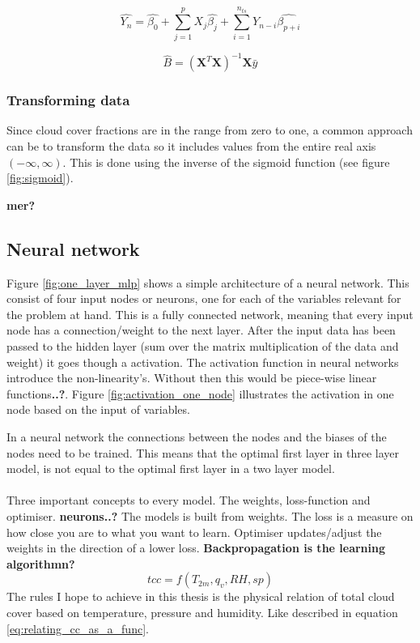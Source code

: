 \begin{equation} \label{eq:AR-expression}
    \hat{Y_n} = \hat{\beta_0} + \sum_{j=1}^p X_j\hat{\beta_j} + \sum_{i = 1}^{n_{ts}} Y_{n-i}\hat{\beta_{p+i}}
\end{equation}

\begin{equation} \label{eq:AR-solution}
    \hat{B} = \left( \textbf{X}^T\textbf{X} \right)^{-1}\textbf{X}\bar{y}
\end{equation}

\subsubsection{Transforming data} \label{sec:transforming_cloud_cover}
Since cloud cover fractions are in the range from zero to one, a common approach can be to transform the data so it includes values from the entire real axis $(-\infty, \infty)$. This is done using the inverse of the sigmoid function (see figure \ref{fig:sigmoid}).

\textbf{mer?}

\subsection{Neural network}

Figure \ref{fig:one_layer_mlp} shows a simple architecture of a neural network. This consist of four input nodes or neurons, one for each of the variables relevant for the problem at hand. This is a fully connected network, meaning that every input node has a connection/weight to the next layer. After the input data has been passed to the hidden layer (sum over the matrix multiplication of the data and weight) it goes though a activation. The activation function in neural networks introduce the non-linearity's. Without then this would be piece-wise linear functions\textbf{..?}. Figure \ref{fig:activation_one_node} illustrates the activation in one node based on the input of variables. 

In a neural network the connections between the nodes and the biases of the nodes need to be trained. This means that the optimal first layer in three layer model, is not equal to the optimal first layer in a two layer model. 
\\ \\
Three important concepts to every model. The weights, loss-function and optimiser. \textbf{neurons..?} The models is built from weights. The loss is a measure on how close you are to what you want to learn. Optimiser updates/adjust the weights in the direction of a lower loss. \textbf{Backpropagation is the learning algorithmn?} 
\begin{equation} \label{eq:relating_cc_as_a_func}
    tcc = f(T_{2m}, q_v, RH, sp)
\end{equation}
The rules I hope to achieve in this thesis is the physical relation of total cloud cover based on temperature, pressure and humidity. Like described in equation  \eqref{eq:relating_cc_as_a_func}.

